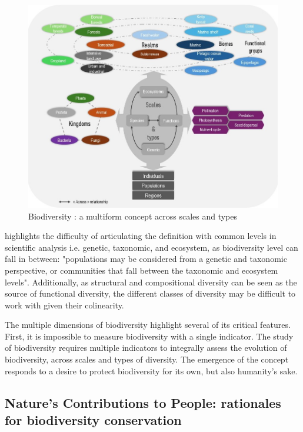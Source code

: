 \begin{figure}
	\centering
	\includegraphics[width =.8\textwidth]{figures/intro/biodiv_illustration.jpg}
	\caption{Biodiversity : a multiform concept across scales and types}
	\label{fig:intro_biod}
\end{figure}

\cite{mouysset_diversity_2023} highlights the difficulty of articulating the definition with common levels in scientific analysis i.e. genetic, taxonomic, and ecosystem, as biodiversity level can fall in between: "populations may be considered from a genetic and taxonomic perspective, or communities that fall between the taxonomic and ecosystem levels". Additionally, as structural and compositional diversity can be seen as the source of functional diversity, the different classes of diversity may be difficult to work with given their colinearity. 

The multiple dimensions of biodiversity highlight several of its critical features. First, it is impossible to measure biodiversity with a single indicator. The study of biodiversity requires multiple indicators to integrally assess the evolution of biodiversity, across scales and types of diversity. The emergence of the concept responds to a desire to protect biodiversity for its own, but also humanity's sake. 

\clearpage

{}
\subsection*{Nature's Contributions to People: rationales for biodiversity conservation}


